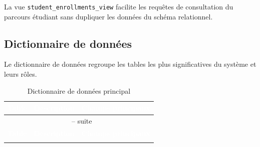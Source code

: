 \documentclass[12pt,a4paper,oneside]{report}
\begin{document}
La vue \texttt{student\_enrollments\_view} facilite les requêtes de consultation du parcours étudiant sans dupliquer les données du schéma relationnel.


\subsection{Dictionnaire de données}

Le dictionnaire de données regroupe les tables les plus significatives du système et leurs rôles.

\renewcommand{\arraystretch}{1.15}
\begin{longtable}{|p{3.4cm}|p{4.4cm}|p{4.4cm}|}
\caption{Dictionnaire de données principal}\label{tab:dictionnaire_donnees}\\
\hline
\rowcolor{ustoblue}
\textcolor{white}{\textbf{Table}} & \textcolor{white}{\textbf{Description}} & \textcolor{white}{\textbf{Champs principaux}} \\
\hline
\endfirsthead
\multicolumn{3}{c}{\tablename~\thetable{} -- suite} \\
\hline
\rowcolor{ustoblue}
\textcolor{white}{\textbf{Table}} & \textcolor{white}{\textbf{Description}} & \textcolor{white}{\textbf{Champs principaux}} \\
\hline
\endhead
\hline
\endfoot


\end{longtable}
\end{document}
